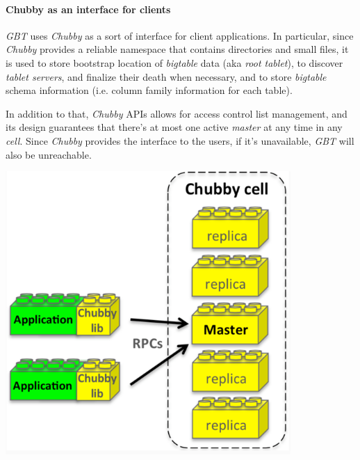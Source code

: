 \noindent\begin{minipage}[c]{0.7\textwidth}
\paragraph{Chubby as an interface for clients}
\emph{GBT} uses \emph{Chubby} as a sort of interface for client applications.
In particular, since \emph{Chubby} provides a reliable namespace that contains
directories and small files, it is used to store bootstrap location of
\emph{bigtable} data (aka \emph{root tablet}), to discover \emph{tablet servers},
and finalize their death when necessary, and to store \emph{bigtable} schema
information (i.e. column family information for each table).

In addition to that, \emph{Chubby} APIs allows for access control list management,
and its design guarantees that there's at most one active \emph{master} at any
time in any \emph{cell}. Since \emph{Chubby} provides the interface to the users,
if it's unavailable, \emph{GBT} will also be unreachable.
\end{minipage}\hfill
\begin{minipage}[c]{0.28\textwidth}
    \centering
    \includegraphics[width=\textwidth]{images/gbt-chubby-1.png}
\end{minipage}

